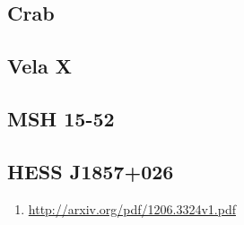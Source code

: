 \subsection{Crab}
\subsection{Vela X}
\subsection{MSH 15-52}
\subsection{HESS J1857+026}

\begin{enumerate}
  \item \url{http://arxiv.org/pdf/1206.3324v1.pdf}
\end{enumerate}
